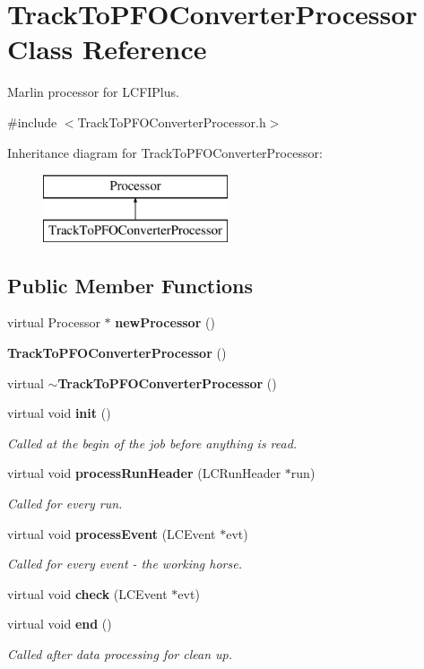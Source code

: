 \section{Track\-To\-P\-F\-O\-Converter\-Processor Class Reference}
\label{classTrackToPFOConverterProcessor}


Marlin processor for L\-C\-F\-I\-Plus.  




{\ttfamily \#include $<$Track\-To\-P\-F\-O\-Converter\-Processor.\-h$>$}

Inheritance diagram for Track\-To\-P\-F\-O\-Converter\-Processor\-:\begin{figure}[H]
\begin{center}
\leavevmode
\includegraphics[height=2.000000cm]{classTrackToPFOConverterProcessor}
\end{center}
\end{figure}
\subsection*{Public Member Functions}
\begin{DoxyCompactItemize}
\item 
virtual Processor $\ast$ {\bf new\-Processor} ()
\item 
{\bf Track\-To\-P\-F\-O\-Converter\-Processor} ()
\item 
virtual {\bf $\sim$\-Track\-To\-P\-F\-O\-Converter\-Processor} ()
\item 
virtual void {\bf init} ()
\begin{DoxyCompactList}\small\item\em Called at the begin of the job before anything is read. \end{DoxyCompactList}\item 
virtual void {\bf process\-Run\-Header} (L\-C\-Run\-Header $\ast$run)
\begin{DoxyCompactList}\small\item\em Called for every run. \end{DoxyCompactList}\item 
virtual void {\bf process\-Event} (L\-C\-Event $\ast$evt)
\begin{DoxyCompactList}\small\item\em Called for every event -\/ the working horse. \end{DoxyCompactList}\item 
virtual void {\bf check} (L\-C\-Event $\ast$evt)
\item 
virtual void {\bf end} ()
\begin{DoxyCompactList}\small\item\em Called after data processing for clean up. \end{DoxyCompactList}\end{DoxyCompactItemize}


